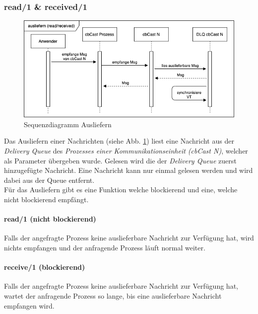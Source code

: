 \newpage

\subsubsection{read/1 \& received/1}

\begin{figure}[htbp]
\begin{center}
\includegraphics[scale=0.5]{Latex/Bilder/Sequenz_ausliefern.png}
\caption{\label{fig:sequence_cbCast_read_receive} Sequenzdiagramm Ausliefern}
\end{center}
\end{figure}

Das Ausliefern einer Nachrichten (siehe Abb. \ref{fig:sequence_cbCast_read_receive}) liest eine Nachricht aus der \textit{Delivery Queue} des \textit{Prozesses einer Kommunikationseinheit (cbCast N)}, welcher als Parameter übergeben wurde. Gelesen wird die der \textit{Delivery Queue} zuerst hinzugefügte Nachricht. Eine Nachricht kann nur einmal gelesen werden und wird dabei aus der Queue entfernt.\\
Für das Ausliefern gibt es eine Funktion welche blockierend und eine, welche nicht blockierend empfängt.

\paragraph{read/1 (nicht blockierend)}

Falls der angefragte Prozess keine auslieferbare Nachricht zur Verfügung hat, wird nichts empfangen und der anfragende Prozess läuft normal weiter.

\paragraph{receive/1 (blockierend)}

Falls der angefragte Prozess keine auslieferbare Nachricht zur Verfügung hat, wartet der anfragende Prozess so lange, bis eine auslieferbare Nachricht empfangen wird.\\

